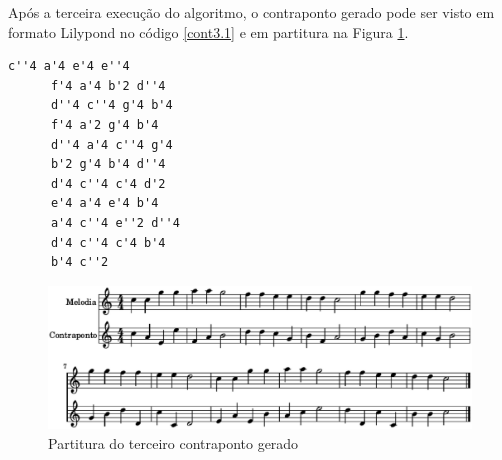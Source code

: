     Após a terceira execução do algoritmo, o contraponto gerado pode ser visto em formato Lilypond no código \ref{cont3.1} e em partitura na Figura \ref{cont3.2}.

    \begin{lstlisting}[caption={Terceiro contraponto gerado}, label={cont3.1}]
      c''4 a'4 e'4 e''4
      f'4 a'4 b'2 d''4
      d''4 c''4 g'4 b'4
      f'4 a'2 g'4 b'4
      d''4 a'4 c''4 g'4
      b'2 g'4 b'4 d''4
      d'4 c''4 c'4 d'2
      e'4 a'4 e'4 b'4
      a'4 c''4 e''2 d''4
      d'4 c''4 c'4 b'4
      b'4 c''2
    \end{lstlisting}

    \begin{figure}[htb]
      \centering
      \includegraphics[scale=0.6]{figuras/cont3.2.eps}
      \caption{Partitura do terceiro contraponto gerado}
      \label{cont3.2}
    \end{figure}
